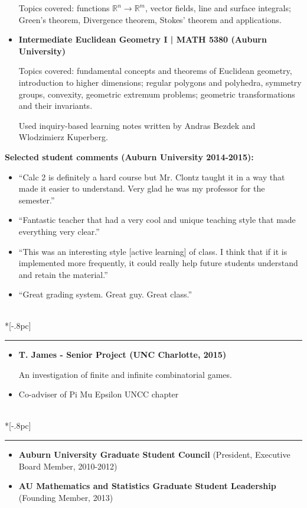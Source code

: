 \documentclass{article}
\newcommand{\headerText}[1]{
  \noindent{\large \bf #1} \\*[-.8pc]
  \rule{\textwidth}{.1pt}}
\begin{document}
\begin{itemize}
    Topics covered: functions \(\mathbb R^n\to\mathbb R^m\), vector fields,
    line and surface integrals; Green's theorem, Divergence theorem,
    Stokes' theorem and applications.

  \item
    \textbf{Intermediate Euclidean Geometry I | MATH 5380 (Auburn University)}

    Topics covered: fundamental concepts and theorems of Euclidean geometry,
    introduction to higher dimensions; regular polygons and polyhedra,
    symmetry groups, convexity, geometric extremum problems; geometric
    transformations and their invariants.

    Used inquiry-based learning notes written by Andras Bezdek and
    Wlodzimierz Kuperberg.
\end{itemize}

\noindent
\textbf{Selected student comments (Auburn University 2014-2015):}
    \begin{itemize}
      \item ``Calc 2 is definitely a hard course but Mr. Clontz taught it in a way that made it easier to understand. Very glad he was my professor for the semester.''
      \item ``Fantastic teacher that had a very cool and unique teaching style that made everything very clear.''
      \item ``This was an interesting style [active learning] of class. I think that if it is implemented more frequently, it could really help future students understand and retain the material.''
      \item ``Great grading system. Great guy. Great class.''
    \end{itemize}



\vfill


\headerText{Mentorship/Advising}
\begin{itemize}
  \item
    \textbf{T. James - Senior Project (UNC Charlotte, 2015)}

    An investigation of finite and infinite combinatorial games.
  \item
    Co-adviser of Pi Mu Epsilon UNCC chapter
\end{itemize}


\vfill
\newpage

\headerText{Service}
\begin{itemize}

  \item
    \textbf{Auburn University Graduate Student Council}
       (President, Executive Board Member, 2010-2012)
  \item
    \textbf{AU Mathematics and Statistics Graduate Student Leadership}
      (Founding Member, 2013)

\end{itemize}
\end{document}
